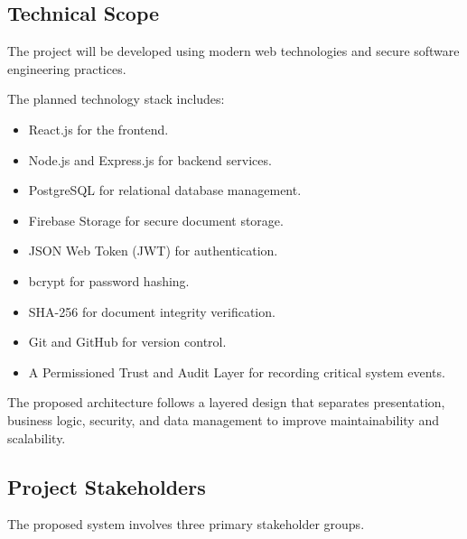 
\subsection{Technical Scope}

The project will be developed using modern web technologies and secure software engineering practices.

The planned technology stack includes:

\begin{itemize}

\item React.js for the frontend.

\item Node.js and Express.js for backend services.

\item PostgreSQL for relational database management.

\item Firebase Storage for secure document storage.

\item JSON Web Token (JWT) for authentication.

\item bcrypt for password hashing.

\item SHA-256 for document integrity verification.

\item Git and GitHub for version control.

\item A Permissioned Trust and Audit Layer for recording critical system events.

\end{itemize}

The proposed architecture follows a layered design that separates presentation, business logic, security, and data management to improve maintainability and scalability.


\subsection{Project Stakeholders}

The proposed system involves three primary stakeholder groups.

